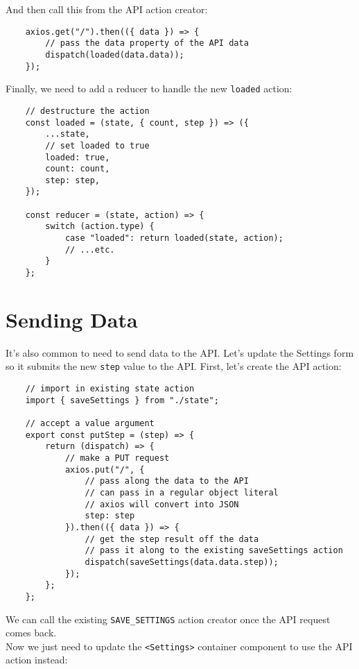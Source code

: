 And then call this from the API action creator:

\begin{verbatim}
    axios.get("/").then(({ data }) => {
        // pass the data property of the API data
        dispatch(loaded(data.data));
    });
\end{verbatim}

Finally, we need to add a reducer to handle the new \texttt{loaded} action:

\begin{verbatim}
    // destructure the action
    const loaded = (state, { count, step }) => ({
        ...state,
        // set loaded to true
        loaded: true,
        count: count,
        step: step,
    });

    const reducer = (state, action) => {
        switch (action.type) {
            case "loaded": return loaded(state, action);
            // ...etc.
        }
    };
\end{verbatim}


\section{Sending Data}

It's also common to need to send data to the API. Let's update the Settings form so it submits the new \texttt{step} value to the API. First, let's create the API action:

\begin{verbatim}
    // import in existing state action
    import { saveSettings } from "./state";

    // accept a value argument
    export const putStep = (step) => {
        return (dispatch) => {
            // make a PUT request
            axios.put("/", {
                // pass along the data to the API
                // can pass in a regular object literal
                // axios will convert into JSON
                step: step
            }).then(({ data }) => {
                // get the step result off the data
                // pass it along to the existing saveSettings action
                dispatch(saveSettings(data.data.step));
            });
        };
    };
\end{verbatim}

We can call the existing \texttt{SAVE\_SETTINGS} action creator once the API request comes back.
\\

Now we just need to update the \texttt{<Settings>} container component to use the API action instead:

